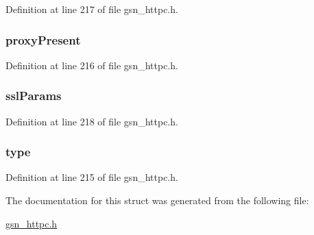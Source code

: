 Definition at line 217 of file gsn\_\-httpc.h.

\hypertarget{a00094_aa0d242f27a688c27c0f37804bb882bc9}{
\subsubsection[{proxyPresent}]{ {\bf proxyPresent}}}
\label{a00094_aa0d242f27a688c27c0f37804bb882bc9}


Definition at line 216 of file gsn\_\-httpc.h.

\hypertarget{a00094_ab1067c0bc67766c8d86dbef645f58430}{
\subsubsection[{sslParams}]{ {\bf sslParams}}}
\label{a00094_ab1067c0bc67766c8d86dbef645f58430}


Definition at line 218 of file gsn\_\-httpc.h.

\hypertarget{a00094_aec5b5c03cb16b35ea00bfbe81a119900}{
\subsubsection[{type}]{ {\bf type}}}
\label{a00094_aec5b5c03cb16b35ea00bfbe81a119900}


Definition at line 215 of file gsn\_\-httpc.h.



The documentation for this struct was generated from the following file:\begin{DoxyCompactItemize}
\item 
\hyperlink{a00507}{gsn\_\-httpc.h}\end{DoxyCompactItemize}
